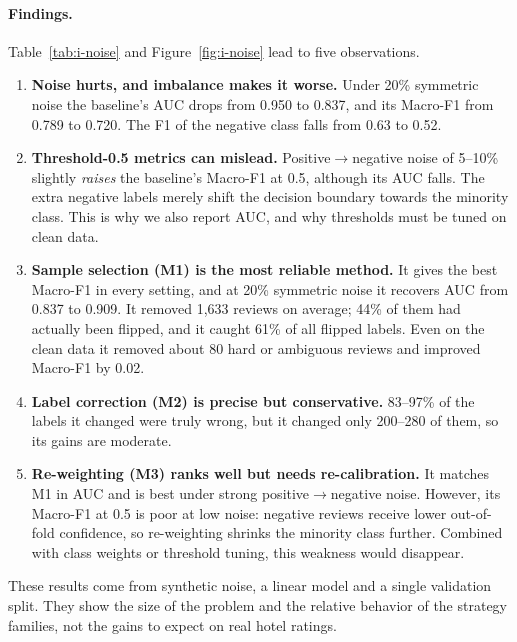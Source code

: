 \paragraph{Findings.}
Table~\ref{tab:i-noise} and Figure~\ref{fig:i-noise} lead to five observations.
\begin{enumerate}
  \item \textbf{Noise hurts, and imbalance makes it worse.} Under 20\% symmetric noise the baseline's AUC drops from 0.950 to 0.837, and its Macro-F1 from 0.789 to 0.720. The F1 of the negative class falls from 0.63 to 0.52.
  \item \textbf{Threshold-0.5 metrics can mislead.} Positive$\to$negative noise of 5--10\% slightly \emph{raises} the baseline's Macro-F1 at 0.5, although its AUC falls. The extra negative labels merely shift the decision boundary towards the minority class. This is why we also report AUC, and why thresholds must be tuned on clean data.
  \item \textbf{Sample selection (M1) is the most reliable method.} It gives the best Macro-F1 in every setting, and at 20\% symmetric noise it recovers AUC from 0.837 to 0.909. It removed 1{,}633 reviews on average; 44\% of them had actually been flipped, and it caught 61\% of all flipped labels. Even on the clean data it removed about 80 hard or ambiguous reviews and improved Macro-F1 by 0.02.
  \item \textbf{Label correction (M2) is precise but conservative.} 83--97\% of the labels it changed were truly wrong, but it changed only 200--280 of them, so its gains are moderate.
  \item \textbf{Re-weighting (M3) ranks well but needs re-calibration.} It matches M1 in AUC and is best under strong positive$\to$negative noise. However, its Macro-F1 at 0.5 is poor at low noise: negative reviews receive lower out-of-fold confidence, so re-weighting shrinks the minority class further. Combined with class weights or threshold tuning, this weakness would disappear.
\end{enumerate}
These results come from synthetic noise, a linear model and a single validation split. They show the size of the problem and the relative behavior of the strategy families, not the gains to expect on real hotel ratings.

